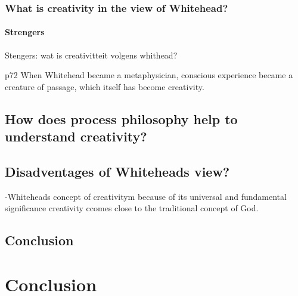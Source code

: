 \subsubsection{What is creativity in the view of Whitehead?}	

\paragraph{Strengers}
Stengers: wat is creativitteit volgens whithead?

p72
When Whitehead became a metaphysician,
conscious experience became a creature of passage, which itself has
become creativity.



\subsection{How does process philosophy help to understand creativity?}
\subsection{Disadventages of Whiteheads view?}
-Whiteheads concept of creativitym because of its universal and fundamental significance creativity ccomes close to the traditional concept of God.

\subsection{Conclusion}


\section{Conclusion}
